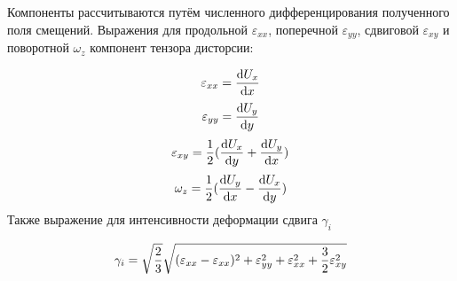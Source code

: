 Компоненты рассчитываются путём численного дифференцирования полученного поля смещений. Выражения для продольной $\varepsilon_{xx}$, поперечной $\varepsilon_{yy}$, сдвиговой $\varepsilon_{xy}$ и поворотной $\omega_z$ компонент тензора дисторсии:

\begin{equation}
\numberwithin{equation}{section}
\label{eq:e_xx}
\varepsilon_{xx}= \frac{\mathrm{d} U_x}{\mathrm{d} x}
\end{equation}
\begin{equation}
\numberwithin{equation}{section}
\label{eq:e_yy}
\varepsilon_{yy}= \frac{\mathrm{d} U_y}{\mathrm{d} y}
\end{equation}
\begin{equation}
\numberwithin{equation}{section}
\label{eq:e_xy}
\varepsilon_{xy}=\frac{1}{2}(\frac{\mathrm{d} U_x}{\mathrm{d} y} + \frac{\mathrm{d} U_y}{\mathrm{d} x})
\end{equation}
\begin{equation}
\numberwithin{equation}{section}
\label{eq:w_z}
\omega_z=\frac{1}{2}(\frac{\mathrm{d} U_y}{\mathrm{d} x} - \frac{\mathrm{d} U_x}{\mathrm{d} y})
\end{equation}
Также выражение для интенсивности деформации сдвига $\gamma_i$

\begin{equation}
\numberwithin{equation}{section}
\label{eq:gamma_i}
\gamma_i = \sqrt\frac{2}{3}\sqrt{(\varepsilon_{xx}-\varepsilon_{xx})^2+\varepsilon_{yy}^2+\varepsilon_{xx}^2 + \frac{3}{2}\varepsilon_{xy}^2}
\end{equation}